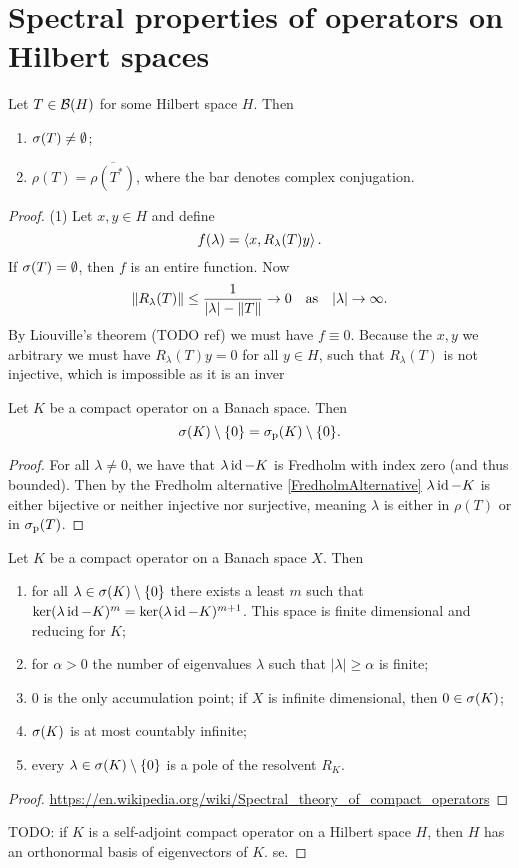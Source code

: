 \section{Spectral properties of operators on Hilbert spaces}
\begin{proposition}
Let $T \in \operatorname{\mathcal{B}}(H)$ for some Hilbert space $H$. Then
\begin{enumerate}
\item $\sigma(T) \neq \emptyset$;
\item $\rho(T) = \overline{\rho(T^*)}$, where the bar denotes complex conjugation.
\end{enumerate}
\end{proposition}
\begin{proof}
(1) Let $x,y\in H$ and define
\[ f(\lambda) = \left\langle x,R_\lambda(T)y \right\rangle. \]
If $\sigma(T) = \emptyset$, then $f$ is an entire function. Now
\[ \lVert R_\lambda(T)\rVert \leq \frac{1}{|\lambda| - \lVert T\rVert} \to 0 \quad\text{as}\quad |\lambda| \to \infty. \]
By Liouville's theorem (TODO ref) we must have $f\equiv 0$. Because the $x,y$ we arbitrary we must have $R_\lambda(T)y = 0$ for all $y\in H$, such that $R_\lambda(T)$ is not injective, which is impossible as it is an inver\begin{proposition}
Let $K$ be a compact operator on a Banach space. Then
\[ \sigma(K)\setminus\{0\} = \sigma_\text{p}(K)\setminus\{0\}. \]
\end{proposition}
\begin{proof}
For all $\lambda\neq 0$, we have that $\lambda\operatorname{id} - K$ is Fredholm with index zero (and thus bounded). Then by the Fredholm alternative \ref{FredholmAlternative} $\lambda\operatorname{id} - K$ is either bijective or neither injective nor surjective, meaning $\lambda$ is either in $\rho(T)$ or in $\sigma_\text{p}(T)$. 
\end{proof}

\begin{proposition} \label{spectrumCompactOperator}
Let $K$ be a compact operator on a Banach space $X$. Then
\begin{enumerate}
\item for all $\lambda\in\sigma(K)\setminus\{0\}$ there exists a least $m$ such that $\ker(\lambda\operatorname{id}- K)^m = \ker(\lambda\operatorname{id}- K)^{m+1}$. This space is finite dimensional and reducing for $K$;
\item for $\alpha > 0$ the number of eigenvalues $\lambda$ such that $|\lambda|\geq \alpha$ is finite;
\item $0$ is the only accumulation point; if $X$ is infinite dimensional, then $0\in\sigma(K)$;
\item $\sigma(K)$ is at most countably infinite;
\item every $\lambda \in \sigma(K)\setminus \{0\}$ is a pole of the resolvent $R_K$.
\end{enumerate}
\end{proposition}
\begin{proof}
\url{https://en.wikipedia.org/wiki/Spectral_theory_of_compact_operators}
\end{proof}
TODO: if $K$ is a self-adjoint compact operator on a Hilbert space $H$, then $H$ has an orthonormal basis of eigenvectors of $K$.
se.


\end{proof}

